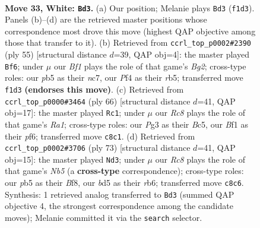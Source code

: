 \documentclass[11pt]{article}
\begin{document}
\clearpage

\begin{figure}[p]\centering
\begin{subfigure}{0.46\textwidth}\centering
\resizebox{\linewidth}{!}{%
\newchessgame
\chessboard[
  setfen={2R5/5ppk/4p3/1p1b3p/1r1PnP1P/4P1P1/8/3N1BK1 w - - 4 33},
  showmover=false,
  pgfstyle=straightmove, color=movearrow, markmove={f1-d3}
]}
\caption{}
\end{subfigure}\hfill
\begin{subfigure}{0.46\textwidth}\centering
\resizebox{\linewidth}{!}{%
\newchessgame
\chessboard[
  setfen={2r3k1/2Nn1pb1/1B2p1p1/PR5p/4P3/7P/6P1/5K2 b - - 0 28},
  showmover=false,
  pgfstyle=straightmove, color=movearrow, markmove={g7-f6}
]}
\caption{}
\end{subfigure}
\\[4pt]
\begin{subfigure}{0.46\textwidth}\centering
\resizebox{\linewidth}{!}{%
\newchessgame
\chessboard[
  setfen={6k1/6p1/4pp2/2B4p/1PN1nP1P/3r1bP1/5P2/R5K1 w - - 9 34},
  showmover=false,
  pgfstyle=straightmove, color=movearrow, markmove={a1-c1}
]}
\caption{}
\end{subfigure}\hfill
\begin{subfigure}{0.46\textwidth}\centering
\resizebox{\linewidth}{!}{%
\newchessgame
\chessboard[
  setfen={r4bk1/P4p2/1R1Np2p/3pP3/1n3P2/8/6PB/6K1 b - - 6 37},
  showmover=false,
  pgfstyle=straightmove, color=movearrow, markmove={b4-d3}
]}
\caption{}
\end{subfigure}
\caption{\textbf{Move 33, White: \texttt{Bd3}.} (a) Our position; Melanie plays \texttt{Bd3} (\texttt{f1d3}). Panels (b)--(d) are the retrieved master positions whose correspondence most drove this move (highest QAP objective among those that transfer to it). (b) Retrieved from \texttt{ccrl\_top\_p0002\#2390} (ply 55) [structural distance $d$=39, QAP obj=4]: the master played \texttt{Bf6}; under $\mu$ our \emph{Bf1} plays the role of that game's \emph{Bg2}; cross-type roles: our \emph{p}b5 as their \emph{n}c7, our \emph{P}f4 as their \emph{r}b5; transferred move \texttt{f1d3} \textbf{(endorses this move)}. (c) Retrieved from \texttt{ccrl\_top\_p0000\#3464} (ply 66) [structural distance $d$=41, QAP obj=17]: the master played \texttt{Rc1}; under $\mu$ our \emph{Rc8} plays the role of that game's \emph{Ra1}; cross-type roles: our \emph{P}g3 as their \emph{B}c5, our \emph{B}f1 as their \emph{p}f6; transferred move \texttt{c8c1}. (d) Retrieved from \texttt{ccrl\_top\_p0002\#3706} (ply 73) [structural distance $d$=41, QAP obj=15]: the master played \texttt{Nd3}; under $\mu$ our \emph{Rc8} plays the role of that game's \emph{Nb5} (a \textbf{cross-type} correspondence); cross-type roles: our \emph{p}b5 as their \emph{B}f8, our \emph{b}d5 as their \emph{r}b6; transferred move \texttt{c8c6}. Synthesis: 1 retrieved analog transferred to \texttt{Bd3} (summed QAP objective 4, the strongest correspondence among the candidate moves); Melanie committed it via the \texttt{search} selector.}
\label{fig:thought-m64}
\end{figure}
\end{document}
